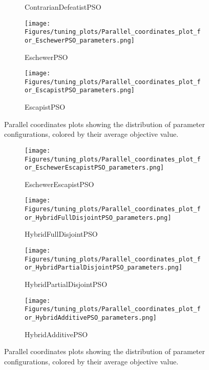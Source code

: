 \begin{figure}[H]
\begin{subfigure}{0.49\textwidth}
        \caption{ContrarianDefeatistPSO}
    \end{subfigure}
        \begin{subfigure}{0.49\textwidth}
        \centering
        \texttt{[image: Figures/tuning\_plots/Parallel\_coordinates\_plot\_for\_EschewerPSO\_parameters.png]}
        \caption{EschewerPSO}
    \end{subfigure}
    \begin{subfigure}{0.49\textwidth}
        \centering
        \texttt{[image: Figures/tuning\_plots/Parallel\_coordinates\_plot\_for\_EscapistPSO\_parameters.png]}
        \caption{EscapistPSO}
    \end{subfigure}
            \captionsetup{list=no}
\caption[Parallel coordinates plots of parameter configurations]{Parallel coordinates plots showing the distribution of  parameter configurations, colored by their average objective value.}
\end{figure}


\begin{figure}[H]\ContinuedFloat
    \centering
    \begin{subfigure}{0.49\textwidth}
        \centering
        \texttt{[image: Figures/tuning\_plots/Parallel\_coordinates\_plot\_for\_EschewerEscapistPSO\_parameters.png]}
        \caption{EschewerEscapistPSO}
    \end{subfigure}
    \begin{subfigure}{0.49\textwidth}
        \centering
        \texttt{[image: Figures/tuning\_plots/Parallel\_coordinates\_plot\_for\_HybridFullDisjointPSO\_parameters.png]}
        \caption{HybridFullDisjointPSO}
    \end{subfigure}
    \begin{subfigure}{0.49\textwidth}
        \centering
        \texttt{[image: Figures/tuning\_plots/Parallel\_coordinates\_plot\_for\_HybridPartialDisjointPSO\_parameters.png]}
        \caption{HybridPartialDisjointPSO}
    \end{subfigure}
    \begin{subfigure}{0.49\textwidth}
        \centering
        \texttt{[image: Figures/tuning\_plots/Parallel\_coordinates\_plot\_for\_HybridAdditivePSO\_parameters.png]}
        \caption{HybridAdditivePSO}
    \end{subfigure}
\caption[Parallel coordinates plots of parameter configurations]{Parallel coordinates plots showing the distribution of  parameter configurations, colored by their average objective value.}
\label{fig:parameter_plots}
\end{figure}